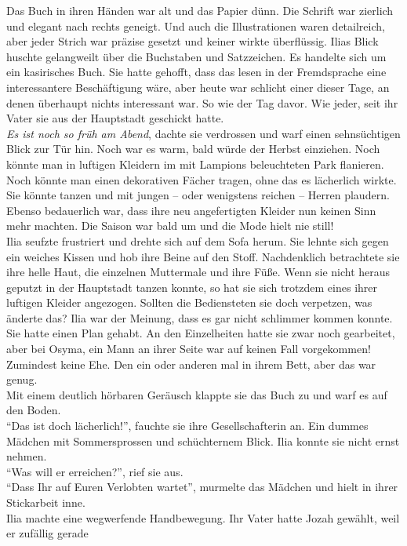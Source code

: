 Das Buch in ihren Händen war alt und das Papier dünn. Die Schrift war zierlich und elegant nach 
rechts geneigt. Und auch die Illustrationen waren detailreich, aber jeder Strich war präzise gesetzt 
und keiner wirkte überflüssig. Ilias Blick huschte gelangweilt über die Buchstaben und Satzzeichen. 
Es handelte sich um ein kasirisches Buch. Sie hatte gehofft, dass das lesen in der Fremdsprache 
eine interessantere Beschäftigung wäre, aber heute war schlicht einer dieser Tage, an denen 
überhaupt nichts interessant war. So wie der Tag davor. Wie jeder, seit ihr Vater sie aus der 
Hauptstadt geschickt hatte. \\
\textit{Es ist noch so früh am Abend}, dachte sie verdrossen und warf einen sehnsüchtigen Blick zur 
Tür hin. Noch war es warm, bald würde der Herbst einziehen. Noch könnte man in luftigen Kleidern im 
mit Lampions beleuchteten Park flanieren. Noch könnte man einen dekorativen Fächer tragen, ohne das 
es lächerlich wirkte. Sie könnte tanzen und mit jungen – oder wenigstens reichen – Herren plaudern. 
Ebenso bedauerlich war, dass ihre neu angefertigten Kleider nun keinen Sinn mehr machten. Die Saison 
war bald um und die Mode hielt nie still! \\
Ilia seufzte frustriert und drehte sich auf dem Sofa herum. Sie lehnte sich gegen ein weiches Kissen 
und hob ihre Beine auf den Stoff. Nachdenklich betrachtete sie ihre helle Haut, die einzelnen 
Muttermale und ihre Füße. Wenn sie nicht heraus geputzt in der Hauptstadt tanzen konnte, so hat sie 
sich trotzdem eines ihrer luftigen Kleider angezogen. Sollten die Bediensteten sie doch verpetzen, 
was änderte das? Ilia war der Meinung, dass es gar nicht schlimmer kommen konnte. Sie hatte einen 
Plan gehabt. An den Einzelheiten hatte sie zwar noch gearbeitet, aber bei Osyma, ein Mann an ihrer 
Seite war auf keinen Fall vorgekommen! Zumindest keine Ehe. Den ein oder anderen mal in ihrem 
Bett, aber das war genug.\\
Mit einem deutlich hörbaren Geräusch klappte sie das Buch zu und warf es auf den Boden. \\
``Das ist doch lächerlich!'', fauchte sie ihre Gesellschafterin an. Ein dummes Mädchen mit 
Sommersprossen und schüchternem Blick. Ilia konnte sie nicht ernst nehmen. \\
``Was will er erreichen?'', rief sie aus. \\
``Dass Ihr auf Euren Verlobten wartet'', murmelte das Mädchen und hielt in ihrer Stickarbeit inne.\\
Ilia machte eine wegwerfende Handbewegung. Ihr Vater hatte Jozah gewählt, weil er zufällig gerade 
